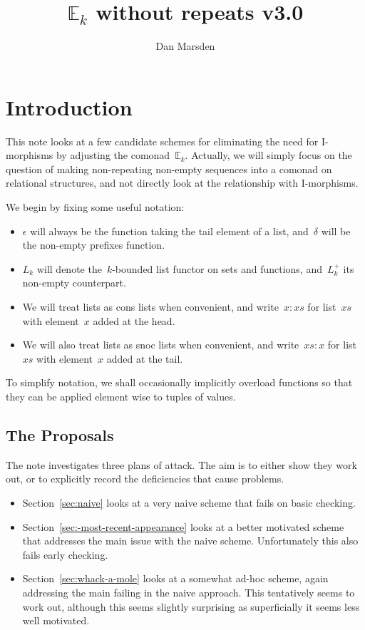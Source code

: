 \documentclass{article}
\title{$\mathbb{E}_k$ without repeats v3.0}
\author{Dan Marsden}
\theoremstyle{plain}
\theoremstyle{definition}
\theoremstyle{remark}
\numberwithin{theorem}{section}
\begin{document}
\maketitle

\section{Introduction}
This note looks at a few candidate schemes for eliminating the need for I-morphisms by adjusting the comonad~$\mathbb{E}_k$. Actually, we will simply focus on the question of making non-repeating non-empty sequences into a comonad on relational structures, and not directly look at the relationship with I-morphisms.

We begin by fixing some useful notation:
\begin{itemize}
    \item $\epsilon$ will always be the function taking the tail element of a list, and~$\delta$ will be the non-empty prefixes function.
    \item $L_k$ will denote the~$k$-bounded list functor on sets and functions, and~$L^+_k$ its non-empty counterpart.
    \item We will treat lists as cons lists when convenient, and write~$x:xs$ for list~$xs$ with element~$x$ added at the head.
    \item We will also treat lists as snoc lists when convenient, and write~$xs:x$ for list~$xs$ with element~$x$ added at the tail.
\end{itemize}
To simplify notation, we shall occasionally implicitly overload functions so that they can be applied element wise to tuples of values.

\subsection*{The Proposals}
The note investigates three plans of attack. The aim is to either show they work out, or to explicitly record the deficiencies that cause problems.
\begin{itemize}
    \item Section~\ref{sec:naive} looks at a very naive scheme that fails on basic checking.
    \item Section~\ref{sec:-most-recent-appearance} looks at a better motivated scheme that addresses the main issue with the naive scheme. Unfortunately this also fails early checking.
    \item Section~\ref{sec:whack-a-mole} looks at a somewhat ad-hoc scheme, again addressing the main failing in the naive approach. This tentatively seems to work out, although this seems slightly surprising as superficially it seems less well motivated.
\end{itemize}
\end{document}
